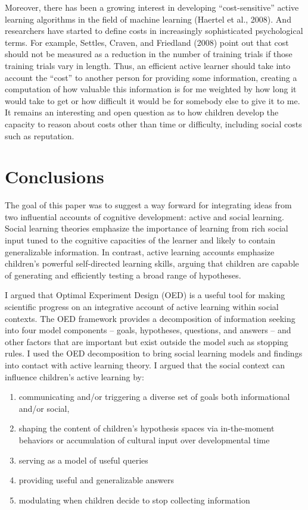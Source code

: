 \documentclass[english,floatsintext,man]{apa6}
\providecommand{\tightlist}{%
  \setlength{\itemsep}{0pt}\setlength{\parskip}{0pt}}
\theoremstyle{definition}
\theoremstyle{definition}
\theoremstyle{definition}
\theoremstyle{remark}
\begin{document}
Moreover, there has been a growing interest in developing
\enquote{cost-sensitive} active learning algorithms in the field of
machine learning (Haertel et al., 2008). And researchers have started to
define costs in increasingly sophisticated psychological terms. For
example, Settles, Craven, and Friedland (2008) point out that cost
should not be measured as a reduction in the number of training trials
if those training trials vary in length. Thus, an efficient active
learner should take into account the \enquote{cost} to another person
for providing some information, creating a computation of how valuable
this information is for me weighted by how long it would take to get or
how difficult it would be for somebody else to give it to me. It remains
an interesting and open question as to how children develop the capacity
to reason about costs other than time or difficulty, including social
costs such as reputation.

\section{Conclusions}\label{conclusions}

The goal of this paper was to suggest a way forward for integrating
ideas from two influential accounts of cognitive development: active and
social learning. Social learning theories emphasize the importance of
learning from rich social input tuned to the cognitive capacities of the
learner and likely to contain generalizable information. In contrast,
active learning accounts emphasize children's powerful self-directed
learning skills, arguing that children are capable of generating and
efficiently testing a broad range of hypotheses.

I argued that Optimal Experiment Design (OED) is a useful tool for
making scientific progress on an integrative account of active learning
within social contexts. The OED framework provides a decomposition of
information seeking into four model components -- goals, hypotheses,
questions, and answers -- and other factors that are important but exist
outside the model such as stopping rules. I used the OED decomposition
to bring social learning models and findings into contact with active
learning theory. I argued that the social context can influence
children's active learning by:

\begin{enumerate}
\def\labelenumi{\arabic{enumi}.}
\tightlist
\item
  communicating and/or triggering a diverse set of goals both
  informational and/or social,
\item
  shaping the content of children's hypothesis spaces via in-the-moment
  behaviors or accumulation of cultural input over developmental time
\item
  serving as a model of useful queries
\item
  providing useful and generalizable answers
\item
  modulating when children decide to stop collecting information
\end{enumerate}
\end{document}
